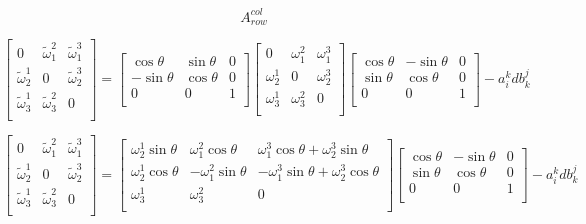 \documentclass[12pt,a4paper]{article}
\begin{document}
\[
A^{col}_{row}
\]

\[
\left[
\begin{array}{ccc}
0 & \tilde{\omega}^2_1 & \tilde{\omega}^3_1 \\
\tilde{\omega}^1_2 & 0 & \tilde{\omega}^3_2 \\
\tilde{\omega}^1_3 & \tilde{\omega}^2_3 & 0 \\
\end{array}
\right]  = \left[
\begin{array}{ccc}
\cos\theta & \sin\theta & 0 \\
-\sin\theta & \cos\theta & 0 \\
0 & 0 & 1 \\
\end{array}
\right]
\left[
\begin{array}{ccc}
0 & \omega^2_1 & \omega^3_1 \\
\omega^1_2 & 0 & \omega^3_2 \\
\omega^1_3 & \omega^2_3 & 0 \\
\end{array}
\right] 
\left[
\begin{array}{ccc}
\cos\theta & -\sin\theta & 0 \\
\sin\theta & \cos\theta & 0 \\
0 & 0 & 1 \\
\end{array}
\right]- a^k_idb^j_k
\]

\[
\left[
\begin{array}{ccc}
0 & \tilde{\omega}^2_1 & \tilde{\omega}^3_1 \\
\tilde{\omega}^1_2 & 0 & \tilde{\omega}^3_2 \\
\tilde{\omega}^1_3 & \tilde{\omega}^2_3 & 0 \\
\end{array}
\right]  = 
\left[
\begin{array}{ccc}
\omega^1_2\sin\theta & \omega^2_1\cos\theta & \omega^3_1\cos\theta+\omega^3_2\sin\theta \\
\omega^1_2\cos\theta & -\omega^2_1\sin\theta & -\omega^3_1\sin\theta+\omega^3_2\cos\theta  \\
\omega^1_3 & \omega^2_3 & 0 \\
\end{array}
\right] 
\left[
\begin{array}{ccc}
\cos\theta & -\sin\theta & 0 \\
\sin\theta & \cos\theta & 0 \\
0 & 0 & 1 \\
\end{array}
\right]- a^k_idb^j_k
\]
\end{document}
